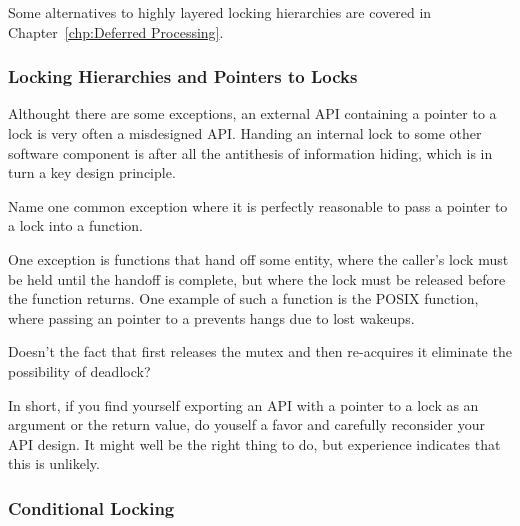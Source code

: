 Some alternatives to highly layered locking hierarchies are covered in
Chapter~\ref{chp:Deferred Processing}.

\subsubsection{Locking Hierarchies and Pointers to Locks}
\label{sec:locking:Locking Hierarchies and Pointers to Locks}

Althought there are some exceptions, an external API containing a pointer
to a lock is very often a misdesigned API.
Handing an internal lock to some other software component is after all
the antithesis of information hiding, which is in turn a key design
principle.

\QuickQuiz{}
	Name one common exception where it is perfectly reasonable
	to pass a pointer to a lock into a function.
 \QuickQuizEnd

One exception is functions that hand off some entity,
where the caller's lock must be held until the handoff is complete,
but where the lock must be released before the function returns.
One example of such a function is the POSIX 
function, where passing an pointer to a 
prevents hangs due to lost wakeups.

\QuickQuiz{}
	Doesn't the fact that  first releases the
	mutex and then re-acquires it eliminate the possibility of deadlock?
 \QuickQuizEnd

In short, if you find yourself exporting an API with a pointer to a
lock as an argument or the return value, do youself a favor and carefully
reconsider your API design.
It might well be the right thing to do, but experience indicates that
this is unlikely.

\subsubsection{Conditional Locking}
\label{sec:locking:Conditional Locking}

